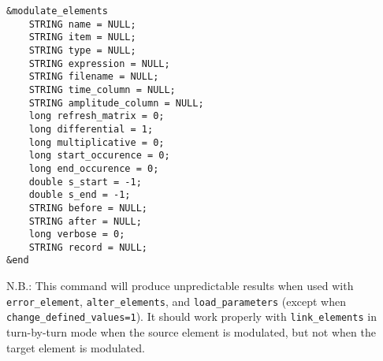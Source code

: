 \documentclass[11pt]{article}
\begin{document}
\begin{verbatim}
&modulate_elements
    STRING name = NULL;
    STRING item = NULL;
    STRING type = NULL;
    STRING expression = NULL;
    STRING filename = NULL;
    STRING time_column = NULL;
    STRING amplitude_column = NULL;
    long refresh_matrix = 0;
    long differential = 1;
    long multiplicative = 0;
    long start_occurence = 0;
    long end_occurence = 0;
    double s_start = -1;
    double s_end = -1;
    STRING before = NULL;
    STRING after = NULL;
    long verbose = 0;
    STRING record = NULL;
&end
\end{verbatim}

N.B.: This command will produce unpredictable results when used with
\verb|error_element|, \verb|alter_elements|, and
\verb|load_parameters| (except when \verb|change_defined_values=1|).
It should work properly with \verb|link_elements| in turn-by-turn mode
when the source element is modulated, but not when the target element
is modulated.
\end{document}
